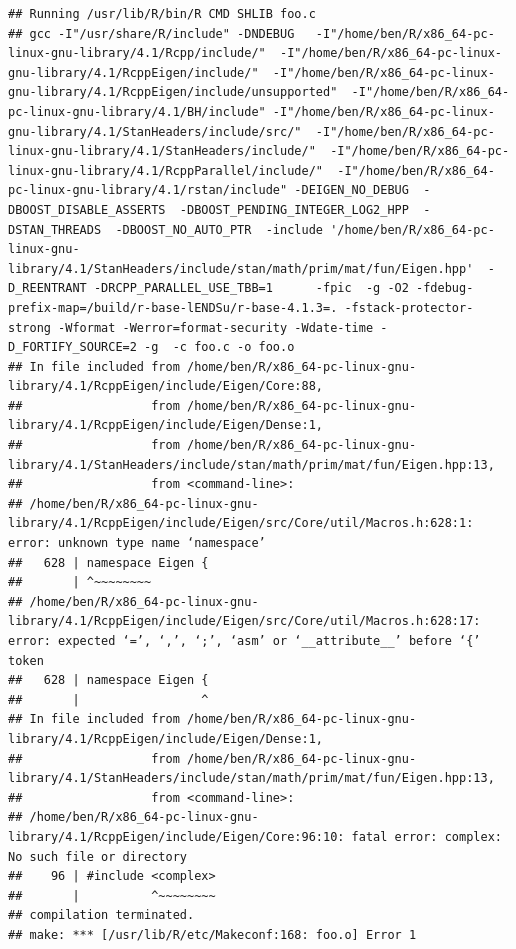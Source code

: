 \documentclass[
]{article}
\begin{document}
\begin{verbatim}
## Running /usr/lib/R/bin/R CMD SHLIB foo.c
## gcc -I"/usr/share/R/include" -DNDEBUG   -I"/home/ben/R/x86_64-pc-linux-gnu-library/4.1/Rcpp/include/"  -I"/home/ben/R/x86_64-pc-linux-gnu-library/4.1/RcppEigen/include/"  -I"/home/ben/R/x86_64-pc-linux-gnu-library/4.1/RcppEigen/include/unsupported"  -I"/home/ben/R/x86_64-pc-linux-gnu-library/4.1/BH/include" -I"/home/ben/R/x86_64-pc-linux-gnu-library/4.1/StanHeaders/include/src/"  -I"/home/ben/R/x86_64-pc-linux-gnu-library/4.1/StanHeaders/include/"  -I"/home/ben/R/x86_64-pc-linux-gnu-library/4.1/RcppParallel/include/"  -I"/home/ben/R/x86_64-pc-linux-gnu-library/4.1/rstan/include" -DEIGEN_NO_DEBUG  -DBOOST_DISABLE_ASSERTS  -DBOOST_PENDING_INTEGER_LOG2_HPP  -DSTAN_THREADS  -DBOOST_NO_AUTO_PTR  -include '/home/ben/R/x86_64-pc-linux-gnu-library/4.1/StanHeaders/include/stan/math/prim/mat/fun/Eigen.hpp'  -D_REENTRANT -DRCPP_PARALLEL_USE_TBB=1      -fpic  -g -O2 -fdebug-prefix-map=/build/r-base-lENDSu/r-base-4.1.3=. -fstack-protector-strong -Wformat -Werror=format-security -Wdate-time -D_FORTIFY_SOURCE=2 -g  -c foo.c -o foo.o
## In file included from /home/ben/R/x86_64-pc-linux-gnu-library/4.1/RcppEigen/include/Eigen/Core:88,
##                  from /home/ben/R/x86_64-pc-linux-gnu-library/4.1/RcppEigen/include/Eigen/Dense:1,
##                  from /home/ben/R/x86_64-pc-linux-gnu-library/4.1/StanHeaders/include/stan/math/prim/mat/fun/Eigen.hpp:13,
##                  from <command-line>:
## /home/ben/R/x86_64-pc-linux-gnu-library/4.1/RcppEigen/include/Eigen/src/Core/util/Macros.h:628:1: error: unknown type name ‘namespace’
##   628 | namespace Eigen {
##       | ^~~~~~~~~
## /home/ben/R/x86_64-pc-linux-gnu-library/4.1/RcppEigen/include/Eigen/src/Core/util/Macros.h:628:17: error: expected ‘=’, ‘,’, ‘;’, ‘asm’ or ‘__attribute__’ before ‘{’ token
##   628 | namespace Eigen {
##       |                 ^
## In file included from /home/ben/R/x86_64-pc-linux-gnu-library/4.1/RcppEigen/include/Eigen/Dense:1,
##                  from /home/ben/R/x86_64-pc-linux-gnu-library/4.1/StanHeaders/include/stan/math/prim/mat/fun/Eigen.hpp:13,
##                  from <command-line>:
## /home/ben/R/x86_64-pc-linux-gnu-library/4.1/RcppEigen/include/Eigen/Core:96:10: fatal error: complex: No such file or directory
##    96 | #include <complex>
##       |          ^~~~~~~~~
## compilation terminated.
## make: *** [/usr/lib/R/etc/Makeconf:168: foo.o] Error 1
\end{verbatim}
\end{document}

